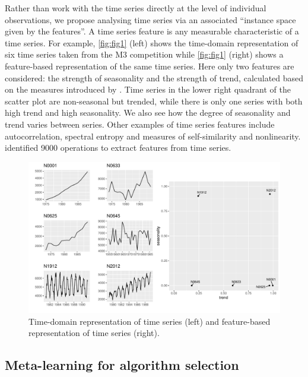\documentclass[11pt,a4paper,]{article}
\begin{document}
Rather than work with the time series directly at the level of individual observations, we propose analysing time series via an associated ``instance space given by the features''. A time series feature is any measurable characteristic of a time series. For example, \autoref{fig:fig1} (left) shows the time-domain representation of six time series taken from the M3 competition \autocite{makridakis2000m3} while \autoref{fig:fig1} (right) shows a feature-based representation of the same time series. Here only two features are considered: the strength of seasonality and the strength of trend, calculated based on the measures introduced by \textcite{wang2009rule}. Time series in the lower right quadrant of the scatter plot are non-seasonal but trended, while there is only one series with both high trend and high seasonality. We also see how the degree of seasonality and trend varies between series. Other examples of time series features include autocorrelation, spectral entropy and measures of self-similarity and nonlinearity. \textcite{fulcher2014highly} identified 9000 operations to extract features from time series.

\begin{figure}

{\centering \includegraphics[width=\textwidth]{figure/fig1-1} 

}

\caption{Time-domain representation of time series (left) and feature-based representation of time series (right).}\label{fig:fig1}
\end{figure}

\hypertarget{meta-learning-for-algorithm-selection}{%
\subsection{Meta-learning for algorithm selection}\label{meta-learning-for-algorithm-selection}}
\end{document}
